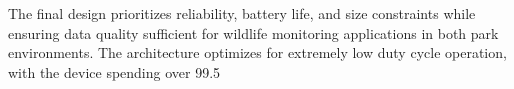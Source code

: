 The final design prioritizes reliability, battery life, and size constraints while ensuring data quality sufficient for wildlife monitoring applications in both park environments. The architecture optimizes for extremely low duty cycle operation, with the device spending over 99.5%